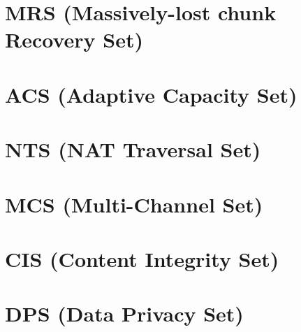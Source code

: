 \section{MRS (Massively-lost chunk Recovery Set)}


\section{ACS (Adaptive Capacity Set)}


\section{NTS (NAT Traversal Set)}


\section{MCS (Multi-Channel Set)}


\section{CIS (Content Integrity Set)}


\section{DPS (Data Privacy Set)}


\begin{comment}

\end{comment}


